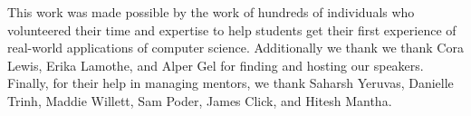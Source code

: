 This work was made possible by the work of hundreds of individuals who volunteered their time and expertise to help students get their first experience of real-world applications of computer science. Additionally we thank we thank Cora Lewis, Erika Lamothe, and Alper Gel for finding and hosting our speakers. Finally, for their help in managing mentors, we thank Saharsh Yeruvas, Danielle Trinh, Maddie Willett, Sam Poder, James Click, and Hitesh Mantha.